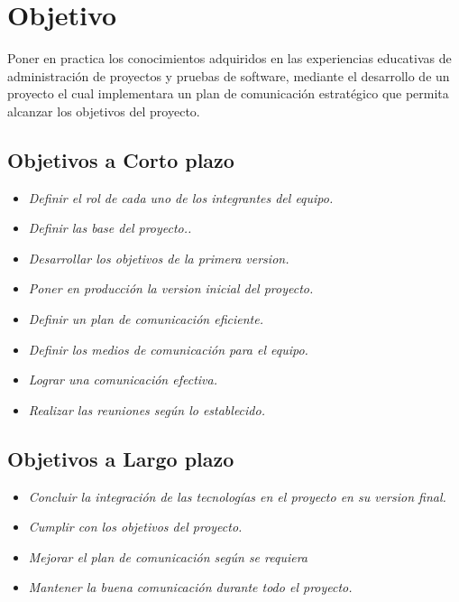 \documentclass[12pt,a4paper]{article}
\date{\today}
\begin{document}


\section{Objetivo}
Poner en practica los conocimientos adquiridos en las experiencias educativas de administración de proyectos y pruebas de software, mediante el desarrollo de un proyecto el cual implementara un plan de comunicación estratégico que permita alcanzar los objetivos del proyecto.

\subsection{Objetivos a Corto plazo}
\begin{itemize}
\item \textit{Definir el rol de cada uno de los integrantes del equipo.}
\item \textit{Definir las base del proyecto..}
\item \textit{Desarrollar los objetivos de la primera version.}
\item \textit{Poner en producción la version inicial del proyecto.}
\item \textit{Definir un plan de comunicación eficiente.}
\item \textit{Definir los medios de comunicación para el equipo.}
\item \textit{Lograr una comunicación efectiva.}
\item \textit{Realizar las reuniones según lo establecido.}
\end{itemize}
\vspace{0.5 cm} 

\subsection{Objetivos a Largo plazo}
\begin{itemize}
\item \textit{Concluir la integración de las tecnologías en el proyecto en su version final.}
\item \textit{Cumplir con los objetivos del proyecto.}
\item \textit{Mejorar el plan de comunicación según se requiera}
\item \textit{Mantener la buena comunicación durante todo el proyecto.}
\end{itemize}
\end{document}
